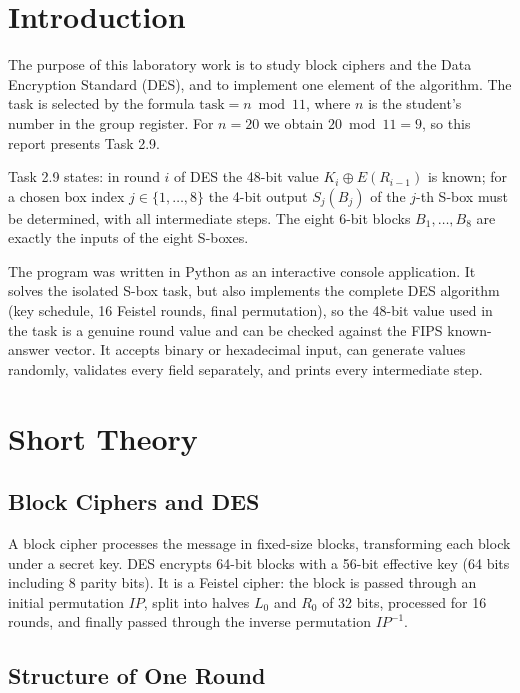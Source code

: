 \documentclass[12pt,a4paper]{article}
\begin{document}
\setcounter{page}{2}
\tableofcontents
\newpage

\section*{Introduction}

The purpose of this laboratory work is to study block ciphers and the Data Encryption Standard (DES), and to implement one element of the algorithm. The task is selected by the formula $\mathrm{task} = n \bmod 11$, where $n$ is the student's number in the group register. For $n = 20$ we obtain $20 \bmod 11 = 9$, so this report presents Task 2.9.

Task 2.9 states: in round $i$ of DES the 48-bit value $K_i \oplus E(R_{i-1})$ is known; for a chosen box index $j \in \{1,\ldots,8\}$ the 4-bit output $S_j(B_j)$ of the $j$-th S-box must be determined, with all intermediate steps. The eight 6-bit blocks $B_1,\ldots,B_8$ are exactly the inputs of the eight S-boxes.

The program was written in Python as an interactive console application. It solves the isolated S-box task, but also implements the complete DES algorithm (key schedule, 16 Feistel rounds, final permutation), so the 48-bit value used in the task is a genuine round value and can be checked against the FIPS known-answer vector. It accepts binary or hexadecimal input, can generate values randomly, validates every field separately, and prints every intermediate step.

\newpage
\section{Short Theory}

\subsection{Block Ciphers and DES}

A block cipher processes the message in fixed-size blocks, transforming each block under a secret key. DES encrypts 64-bit blocks with a 56-bit effective key (64 bits including 8 parity bits). It is a Feistel cipher: the block is passed through an initial permutation $IP$, split into halves $L_0$ and $R_0$ of 32 bits, processed for 16 rounds, and finally passed through the inverse permutation $IP^{-1}$.

\subsection{Structure of One Round}
\end{document}
